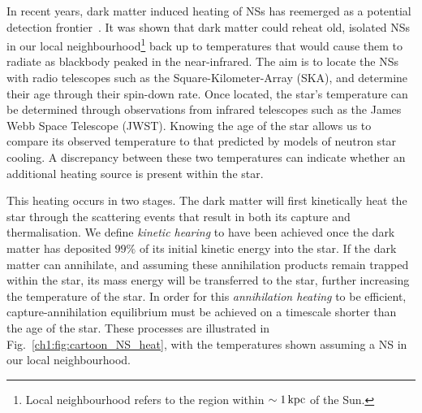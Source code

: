 In recent years, dark matter induced heating of NSs has reemerged as a potential detection frontier~\cite{Raj:2017wrv_feb_Neutronstarsdark, Baryakhtar:2017dbj_sep_DarkKineticHeating, Bell:2018pkk_sep_HeatingNeutronStars,Joglekar:2019vzy_sep_Relativisticcapturedark, Acevedo:2019agu_mar_WarmingNuclearPasta, Bell:2019pyc_jun_CaptureLeptophilicDark, Garani:2019fpa_aug_Darkmatterinteractions,Chatterjee:2022dhp_jul_Faintlightold}. It was shown that dark matter could reheat old, isolated NSs in our local neighbourhood\footnote{Local neighbourhood refers to the region within $\sim 1{\rm \,kpc}$ of the Sun.} back up to temperatures that would cause them to radiate as blackbody peaked in the near-infrared. 
The aim is to locate the NSs with radio telescopes such as the Square-Kilometer-Array (SKA), and determine their age through their spin-down rate. 
Once located, the star's temperature can be determined through observations from infrared telescopes such as the James Webb Space Telescope (JWST). Knowing the age of the star allows us to compare its observed temperature to that predicted by models of neutron star cooling. A discrepancy between these two temperatures can indicate whether an additional heating source is present within the star. 

This heating occurs in two stages. The dark matter will first kinetically heat the star through the scattering events that result in both its capture and thermalisation. We define \textit{kinetic hearing} to have been achieved once the dark matter has deposited $99\%$ of its initial kinetic energy into the star.
If the dark matter can annihilate, and assuming these annihilation products remain trapped within the star, its mass energy will be transferred to the star, further increasing the temperature of the star. In order for this \textit{annihilation heating} to be efficient, capture-annihilation equilibrium must be achieved on a timescale shorter than the age of the star. These processes are illustrated in Fig.~\ref{ch1:fig:cartoon_NS_heat}, with the temperatures shown assuming a NS in our local neighbourhood.


